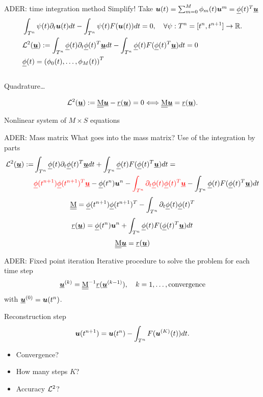 \documentclass[9pt,compress,t,aspectratio=169]{beamer}
\begin{document}
\begin{frame}{ADER: time integration method}
Simplify!  Take $\bc(t) = \sum_{m=0}^M \phi_m(t) \bc^m = \bphi(t)^T\bbc$
\begin{align*}\label{eq:ADERODEL2}
&\int_{T^n}  \psi(t)\partial_t \bc(t) dt - \int_{T^n} \psi(t)F(\bc(t))  dt = 0, \quad  \forall \psi: T^n=[t^n,t^{n+1}]\to \R.
\\
&\L^2(\bbc ):= \int_{T^n} \bphi(t) \partial_t \bphi(t)^T \bbc dt - \int_{T^n} \bphi(t)  F(\bphi(t)^T\bbc)  dt = 0\\
&\bphi(t) = \left( \phi_0(t), \dots, \phi_M(t) \right)^T
\end{align*}\\

Quadrature\dots

\begin{equation}\label{fix:point}
\L^2(\bbc):=\M\bbc-\vec{r}(\bbc)=0 \Longleftrightarrow  \M \bbc = \vec{r}(\bbc)  .
\end{equation}

Nonlinear system of $M \times S$ equations


\end{frame}
\begin{frame}{ADER: Mass matrix}
	What goes into the mass matrix? Use of the integration by parts
	\begin{align*}
		\L^2(\bbc ):=& \int_{T^n} \bphi(t) \partial_t \bphi(t)^T \bbc dt + \int_{T^n} \bphi(t)  F(\bphi(t)^T\bbc)  dt =\\
		&{\color{red}\bphi(t^{n+1}) \bphi(t^{n+1})^T \bbc} - \bphi(t^{n}) \bc^n -  {\color{red}\int_{T^n} \partial_t \bphi(t) \bphi(t)^T \bbc }  - \int_{T^n} \bphi(t)  F(\bphi(t)^T\bbc)  dt 
	\end{align*}
	$$
	\M = \bphi(t^{n+1}) \bphi(t^{n+1})^T -\int_{T^n} \partial_t \bphi(t) \bphi(t)^T 
	$$
	$$
	\vec{r}(\bbc) =  \bphi(t^{n}) \bc^n + \int_{T^n} \bphi(t)  F(\bphi(t)^T\bbc)  dt 
	$$
$$
\M \bbc = \vec{r}(\bbc)
$$
\end{frame}


\begin{frame}{ADER: Fixed point iteration}
Iterative procedure to solve the problem for each time step
\begin{equation}\label{fix:point}
\bbc^{(k)}=\M^{-1}\vec{r}(\bbc^{(k-1)}),\quad k=1,\dots, \text{convergence}
\end{equation}
with $\bbc^{(0)}=\bc(t^n)$.

Reconstruction step
\begin{equation*}
	\bc(t^{n+1}) = \bc(t^{n}) - \int_{T^n} F(\bc^{(K)}(t))  dt.
\end{equation*}
\begin{itemize}
\item Convergence?
\item How many steps $K$?
\item Accuracy $\L^2$?
\end{itemize}

\end{frame}
\end{document}
